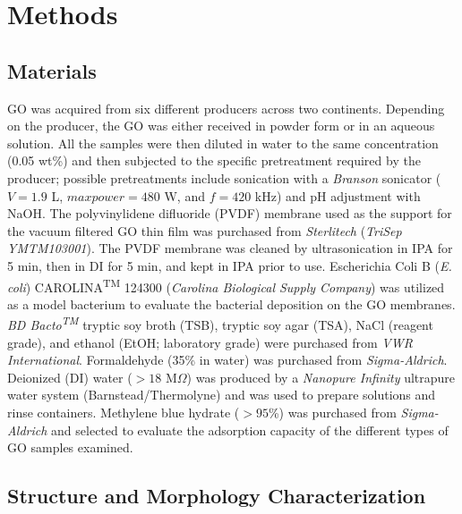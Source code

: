 \section{Methods}
\subsection{Materials}
GO was acquired from six different producers across two continents. Depending on the producer, the GO was either received in powder form or in an aqueous solution. All the samples were then diluted in water to the same concentration (0.05 wt\%) and then subjected to the specific pretreatment required by the producer; possible pretreatments include sonication with a \textit{Branson} sonicator ($V=1.9$ L, $max power=480$ W, and $f=420$ kHz) and pH adjustment with NaOH. The polyvinylidene difluoride (PVDF) membrane used as the support for the vacuum filtered GO thin film was purchased from \textit{Sterlitech} (\textit{TriSep YMTM103001}). The PVDF membrane was cleaned by ultrasonication in IPA for 5 min, then in DI for 5 min, and kept in IPA prior to use. Escherichia Coli B (\textit{E. coli}) CAROLINA\textsuperscript{TM} 124300 (\textit{Carolina Biological Supply Company}) was utilized as a model bacterium to evaluate the bacterial deposition on the GO membranes. \textit{BD Bacto\textsuperscript{TM}} tryptic soy broth (TSB), tryptic soy agar (TSA), NaCl (reagent grade), and ethanol (EtOH; laboratory grade) were purchased from \textit{VWR International}. Formaldehyde (35\% in water) was purchased from \textit{Sigma-Aldrich}. Deionized (DI) water ($>18$ M$\Omega$) was produced by a \textit{Nanopure Infinity} ultrapure water system (Barnstead/Thermolyne) and was used to prepare solutions and rinse containers. Methylene blue hydrate ($>95$\%) was purchased from \textit{Sigma-Aldrich} and selected to evaluate the adsorption capacity of the different types of GO samples examined.

\subsection{Structure and Morphology Characterization}

